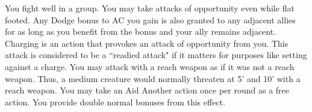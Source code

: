 {You fight well in a group.}
{You may take attacks of opportunity even while flat footed.}
{Any Dodge bonus to AC you gain is also granted to any adjacent allies for as long as you benefit from the bonus and your ally remains adjacent.}
{Charging is an action that provokes an attack of opportunity from you. This attack is considered to be a ``readied attack" if it matters for purposes like setting against a charge.}
{You may attack with a reach weapon as if it was not a reach weapon. Thus, a medium creature would normally threaten at 5' and 10' with a reach weapon.}
{You may take an Aid Another action once per round as a free action. You provide double normal bonuses from this effect.}